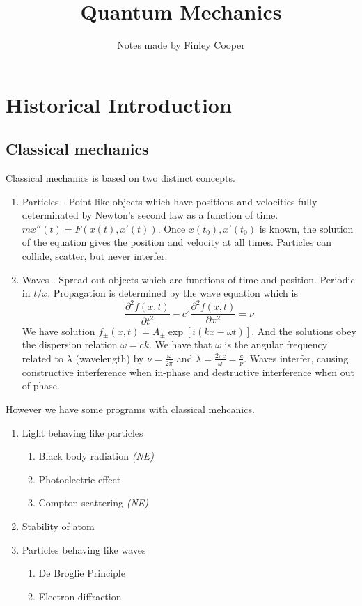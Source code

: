 \documentclass{article}
\title{Quantum Mechanics}
\author{Notes made by Finley Cooper}
\begin{document}
  \maketitle
  \newpage
  \tableofcontents
  \newpage
\section{Historical Introduction}
\subsection{Classical mechanics}
Classical mechanics is based on two distinct concepts.
\begin{enumerate}
	\item Particles - Point-like objects which have positions and velocities fully determinated by Newton's second law as a function of time. $ mx''(t)=F(x(t),x'(t)) $. Once $ x(t_0), x'(t_0) $ is known, the solution of the equation gives the position and velocity at all times. Particles can collide, scatter, but never interfer.
	\item Waves - Spread out objects which are functions of time and position. Periodic in $ t/x $. Propagation is determined by the wave equation which is \[
			\frac{\partial^2f(x,t)}{\partial t^2}-c^2\frac{\partial^2f(x,t)}{\partial x^2}=\nu
	\]
	We have solution $ f_{\pm}(x,t)=A_{\pm}\exp[i(kx-\omega t)] $. And the solutions obey the dispersion relation $ \omega=ck $. We have that $ \omega $ is the angular  frequency related to $ \lambda $ (wavelength) by $ \nu=\frac \omega{2\pi} $ and $ \lambda = \frac {2\pi c}{\omega}=\frac c\nu $. Waves interfer, causing constructive interference when in-phase and destructive interference when out of phase.
\end{enumerate}
\smallskip
However we have some programs with classical mehcanics.
	\begin{enumerate}
		\item Light behaving like particles
			\begin{enumerate}
				\item Black body radiation \textit{(NE)}
				\item Photoelectric effect
				\item Compton scattering \textit{(NE)}
			\end{enumerate}

		\item Stability of atom
		\item Particles behaving like waves
			\begin{enumerate}
				\item De Broglie Principle
				\item Electron diffraction
			\end{enumerate}
	\end{enumerate}
\end{document}
